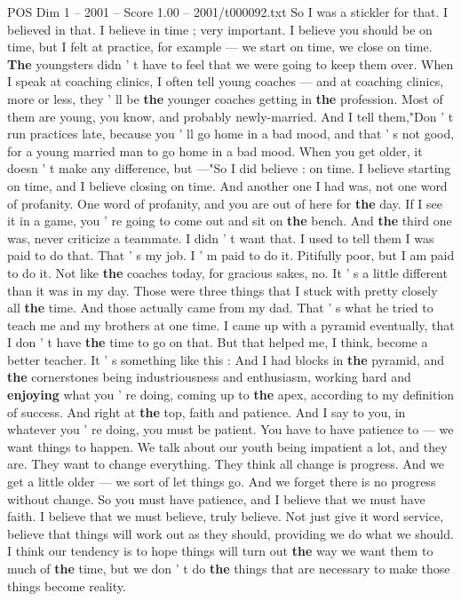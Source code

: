 \begin{textsample}{POS Dim 1 – 2001 – Score 1.00 – 2001/t000092.txt}
So I was a stickler for that.
I believed in that.
I believe in time ; very important.
I believe you should be on time, but I felt at practice, for example — we start on time, we close on time. \textbf{The} youngsters didn ' t have to feel that we were going to keep them over.
When I speak at coaching clinics, I often tell young coaches — and at coaching clinics, more or less, they ' ll be \textbf{the} younger coaches getting in \textbf{the} profession.
Most of them are young, you know, and probably newly-married.
And I tell them,"Don ' t run practices late, because you ' ll go home in a bad mood, and that ' s not good, for a young married man to go home in a bad mood.
When you get older, it doesn ' t make any difference, but —"So I did believe : on time.
I believe starting on time, and I believe closing on time.
And another one I had was, not one word of profanity.
One word of profanity, and you are out of here for \textbf{the} day.
If I see it in a game, you ' re going to come out and sit on \textbf{the} bench.
And \textbf{the} third one was, never criticize a teammate.
I didn ' t want that.
I used to tell them I was paid to do that.
That ' s my job.
I ' m paid to do it.
Pitifully poor, but I am paid to do it.
Not like \textbf{the} coaches today, for gracious sakes, no.
It ' s a little different than it was in my day.
Those were three things that I stuck with pretty closely all \textbf{the} time.
And those actually came from my dad.
That ' s what he tried to teach me and my brothers at one time.
I came up with a pyramid eventually, that I don ' t have \textbf{the} time to go on that.
But that helped me, I think, become a better teacher.
It ' s something like this : And I had blocks in \textbf{the} pyramid, and \textbf{the} cornerstones being industriousness and enthusiasm, working hard and \textbf{enjoying} what you ' re doing, coming up to \textbf{the} apex, according to my definition of success.
And right at \textbf{the} top, faith and patience.
And I say to you, in whatever you ' re doing, you must be patient.
You have to have patience to — we want things to happen.
We talk about our youth being impatient a lot, and they are.
They want to change everything.
They think all change is progress.
And we get a little older — we sort of let things go.
And we forget there is no progress without change.
So you must have patience, and I believe that we must have faith.
I believe that we must believe, truly believe.
Not just give it word service, believe that things will work out as they should, providing we do what we should.
I think our tendency is to hope things will turn out \textbf{the} way we want them to much of \textbf{the} time, but we don ' t do \textbf{the} things that are necessary to make those things become reality.

\end{textsample}
